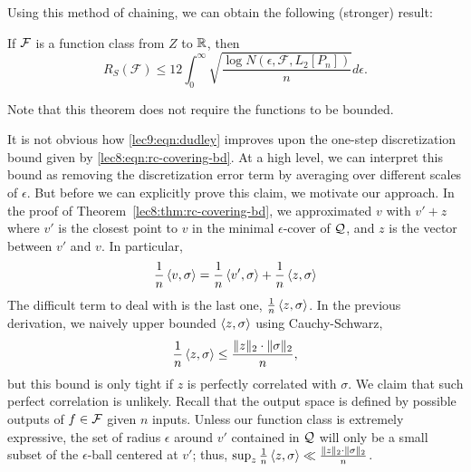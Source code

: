 Using this method of chaining, we can obtain the following (stronger) result:

\begin{theorem}
If $\mathcal F$ is a function class from $Z$ to $\mathbb R$, then
\begin{equation}
    R_S(\mathcal{F})\leq 12\int_{0}^{\infty}\sqrt{\frac{\log N(\epsilon, \mathcal{F}, L_2[P_n])}{n}}d\epsilon. \label{lec9:eqn:dudley}
\end{equation}
\end{theorem}

Note that this theorem does not require the functions to be bounded.

\begin{remark}
It is not obvious how \eqref{lec9:eqn:dudley} improves upon the one-step discretization bound given by \eqref{lec8:eqn:rc-covering-bd}. At a high level, we can interpret this bound as removing the discretization error term by averaging over different scales of $\epsilon$.  But before we can explicitly prove this claim, we motivate our approach. In the proof of Theorem~\ref{lec8:thm:rc-covering-bd}, we approximated $v$ with $v' + z$ where $v'$ is the closest point to $v$ in the minimal $\epsilon$-cover of $\mathcal Q$, and $z$ is the vector between $v'$ and $v$. In particular,
\begin{equation}
    \frac 1 n \left\langle v, \sigma\right\rangle = \frac 1 n \left\langle v', \sigma\right\rangle + \frac 1 n \left\langle z, \sigma\right\rangle \label{lec9:eqn:disc_decomp}
\end{equation}
The difficult term to deal with is the last one, $\frac 1 n \left\langle z, \sigma\right\rangle$. In the previous derivation, we naively upper bounded $\left\langle z, \sigma\right\rangle$ using Cauchy-Schwarz,
\begin{equation}
    \frac 1 n \left\langle z,\sigma\right\rangle \le \frac{\|z\|_2\cdot \|\sigma\|_2} n,
\end{equation}
but this bound is only tight if $z$ is perfectly correlated with $\sigma$. We claim that such perfect correlation is unlikely. Recall that the output space is defined by possible outputs of $f \in \mathcal F$ given $n$ inputs. Unless our function class is extremely expressive, the set of radius $\epsilon$ around $v'$ contained in $\mathcal Q$ will only be a small subset of the $\epsilon$-ball centered at $v'$; thus, $\sup_{z} \frac{1}{n} \left\langle z, \sigma\right\rangle \ll \frac{\|z\|_2 \cdot \|\sigma\|_2}{n}$.


\end{remark}
